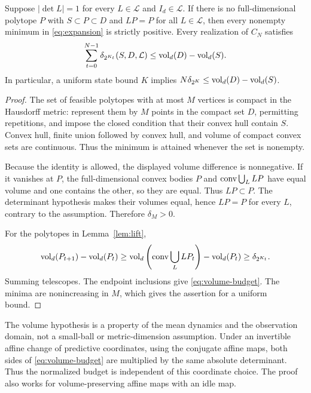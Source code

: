 \begin{theorem}\label{thm:volume}
Suppose $|\det L|=1$ for every $L\in\mathcal L$ and $I_d\in\mathcal L$.
If there is no full-dimensional polytope $P$ with
$S\subset P\subset D$ and $LP=P$ for all $L\in\mathcal L$, then every
nonempty minimum in \eqref{eq:expansion} is strictly positive.
Every realization of $C_N$ satisfies
\begin{equation}\label{eq:volume-budget}
 \sum_{t=0}^{N-1}\delta_{2^{K_t}}(S,D,\mathcal L)
                       \le\operatorname{vol}_d(D)-\operatorname{vol}_d(S).
\end{equation}
In particular, a uniform state bound $K$ implies
$N\delta_{2^K}\le\operatorname{vol}_d(D)-\operatorname{vol}_d(S)$.
\end{theorem}
\begin{proof}
The set of feasible polytopes with at most $M$ vertices is compact in
the Hausdorff metric: represent them by $M$ points in the compact set
$D$, permitting repetitions, and impose the closed condition that their
convex hull contain $S$. Convex hull, finite union followed by convex
hull, and volume of compact convex sets are continuous. Thus the
minimum is attained whenever the set is nonempty.

Because the identity is allowed, the displayed volume difference is
nonnegative. If it vanishes at $P$, the full-dimensional convex bodies
$P$ and $\operatorname{conv}\bigcup_LLP$ have equal volume and one contains the
other, so they are equal. Thus $LP\subset P$. The determinant hypothesis
makes their volumes equal, hence $LP=P$ for every $L$, contrary to the
assumption. Therefore $\delta_M>0$.

For the polytopes in Lemma~\ref{lem:lift},
\[
 \operatorname{vol}_d(P_{t+1})-\operatorname{vol}_d(P_t)
 \ge\operatorname{vol}_d\left(\operatorname{conv}\bigcup_LLP_t\right)-\operatorname{vol}_d(P_t)
 \ge\delta_{2^{K_t}}.
\]
Summing telescopes. The endpoint inclusions give
\eqref{eq:volume-budget}. The minima are nonincreasing in $M$, which
gives the assertion for a uniform bound.
\end{proof}

The volume hypothesis is a property of the mean dynamics and the
observation domain, not a small-ball or metric-dimension assumption.
Under an invertible affine change of predictive coordinates, using the
conjugate affine maps, both sides of \eqref{eq:volume-budget} are
multiplied by the same absolute determinant. Thus the normalized budget
is independent of this coordinate choice. The proof also works for
volume-preserving affine maps with an idle map.

